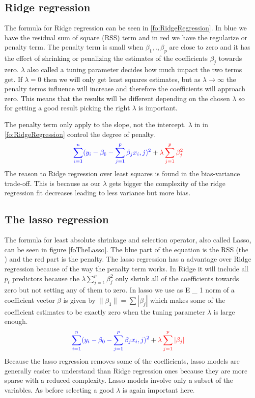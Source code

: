 \subsection{Ridge regression}
The formula for Ridge regression can be seen in \ref{fo:RidgeRegression}. In blue we have the residual sum of square (RSS) term and in red we have the regularize or penalty term. The penalty term is small when $\beta_1, . ,\beta_p$ are close to zero and it has the effect of shrinking or penalizing the estimates of the coefficients $\beta_j$ towards zero. $\lambda$ also called a tuning parameter decides how much impact the two terms get. If $\lambda = 0$ then we will only get least squares estimates, but as $ \lambda \to \infty$ the penalty terms influence will increase and therefore the coefficients will approach zero. This means that the results will be different depending on the chosen $\lambda$ so for getting a good result picking the right $\lambda$ is important.

\noindent The penalty term only apply to the slope, not the intercept. $\lambda$ in in \ref{fo:RidgeRegression} control the degree of penalty.
\begin{align}\label{fo:RidgeRegression}
\color{blue} \sum_{i=1}^{n} ( y_i - \beta_0 - \sum_{j=1}^{p} \beta_j x_i,j )^2 \color{black} + \color{red} \lambda \sum_{j=1}^{p} \beta^2_j 
\end{align}
The reason to Ridge regression over least squares is found in the bias-variance
trade-off. This is because as our $\lambda$ gets bigger the complexity of the ridge regression fit decreases leading to less variance but more bias.

\subsection{The lasso regression}
The formula for least absolute shrinkage and selection operator, also called Lasso, can be seen in figure \ref{foTheLasso}. The blue part of the equation is the RSS (the ) and the red part is the penalty. The lasso regression has a advantage over Ridge regression because of the way the penalty term works. In Ridge it will include all $p_i$ predictors because the $\lambda \sum_{j=1}^{p} \beta^2_j$ only shrink all of the coefficients towards zero but not setting any of them to zero. In lasso we use as E \_ 1 norm of a coefficient vector $\beta$ is given by $ \lVert \beta_1 \rVert = \sum | \beta_j |$ which makes some of the coefficient estimates to be exactly zero when the tuning parameter $\lambda$ is large enough.
\begin{align}\label{fo:TheLasso}
\color{blue} \sum_{i=1}^{n} ( y_i - \beta_0 - \sum_{j=1}^{p} \beta_j x_i,j )^2 \color{black} +  \color{red} \lambda \sum_{j=1}^{p} |\beta_j|
\end{align}
Because the lasso regression removes some of the coefficients, lasso models are generally easier to understand than Ridge regression ones because they are  more sparse with a reduced complexity. Lasso models involve only a subset of the variables. As before selecting a good $\lambda$ is again important here.


